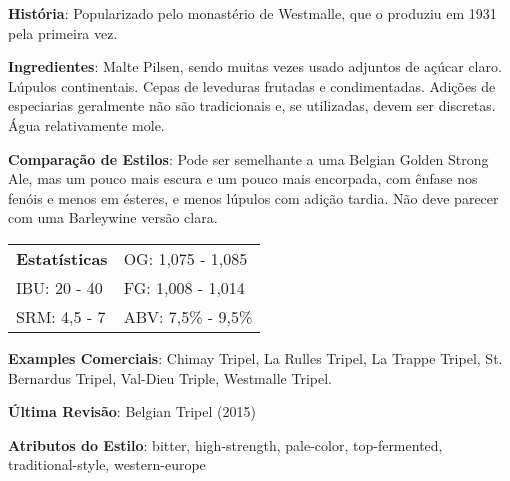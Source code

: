 \textbf{História}: Popularizado pelo monastério de Westmalle, que o produziu em 1931 pela primeira vez.

\textbf{Ingredientes}: Malte Pilsen, sendo muitas vezes usado adjuntos de açúcar claro. Lúpulos continentais. Cepas de leveduras frutadas e condimentadas. Adições de especiarias geralmente não são tradicionais e, se utilizadas, devem ser discretas. Água relativamente mole.

\textbf{Comparação de Estilos}: Pode ser semelhante a uma Belgian Golden Strong Ale, mas um pouco mais escura e um pouco mais encorpada, com ênfase nos fenóis e menos em ésteres, e menos lúpulos com adição tardia. Não deve parecer com uma Barleywine versão clara.

\begin{tabular}{@{}p{35mm}p{35mm}@{}}
  \textbf{Estatísticas} & OG: 1,075 - 1,085 \\
  IBU: 20 - 40  & FG: 1,008 - 1,014  \\
  SRM: 4,5 - 7  & ABV: 7,5\% - 9,5\%
\end{tabular}

\textbf{Examples Comerciais}: Chimay Tripel, La Rulles Tripel, La Trappe Tripel, St. Bernardus Tripel, Val-Dieu Triple, Westmalle Tripel.

\textbf{Última Revisão}: Belgian Tripel (2015)

\textbf{Atributos do Estilo}: bitter, high-strength, pale-color, top-fermented, traditional-style, western-europe
